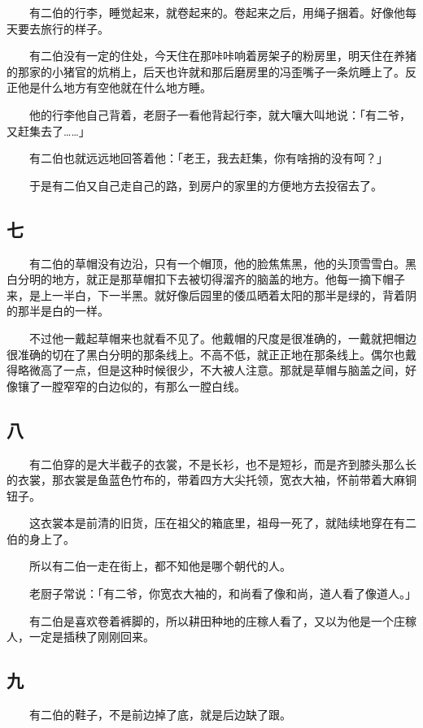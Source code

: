 \documentclass[UTF8]{ctexart}
\begin{document}
　　有二伯的行李，睡觉起来，就卷起来的。卷起来之后，用绳子捆着。好像他每天要去旅行的样子。

　　有二伯没有一定的住处，今天住在那咔咔响着房架子的粉房里，明天住在养猪的那家的小猪官的炕梢上，后天也许就和那后磨房里的冯歪嘴子一条炕睡上了。反正他是什么地方有空他就在什么地方睡。

　　他的行李他自己背着，老厨子一看他背起行李，就大嚷大叫地说：「有二爷，又赶集去了……」

　　有二伯也就远远地回答着他：「老王，我去赶集，你有啥捎的没有呵？」

　　于是有二伯又自己走自己的路，到房户的家里的方便地方去投宿去了。

\subsection{七}

　　有二伯的草帽没有边沿，只有一个帽顶，他的脸焦焦黑，他的头顶雪雪白。黑白分明的地方，就正是那草帽扣下去被切得溜齐的脑盖的地方。他每一摘下帽子来，是上一半白，下一半黑。就好像后园里的倭瓜晒着太阳的那半是绿的，背着阴的那半是白的一样。

　　不过他一戴起草帽来也就看不见了。他戴帽的尺度是很准确的，一戴就把帽边很准确的切在了黑白分明的那条线上。不高不低，就正正地在那条线上。偶尔也戴得略微高了一点，但是这种时候很少，不大被人注意。那就是草帽与脑盖之间，好像镶了一膛窄窄的白边似的，有那么一膛白线。

\subsection{八}

　　有二伯穿的是大半截子的衣裳，不是长衫，也不是短衫，而是齐到膝头那么长的衣裳，那衣裳是鱼蓝色竹布的，带着四方大尖托领，宽衣大袖，怀前带着大麻铜钮子。

　　这衣裳本是前清的旧货，压在祖父的箱底里，祖母一死了，就陆续地穿在有二伯的身上了。

　　所以有二伯一走在街上，都不知他是哪个朝代的人。

　　老厨子常说：「有二爷，你宽衣大袖的，和尚看了像和尚，道人看了像道人。」

　　有二伯是喜欢卷着裤脚的，所以耕田种地的庄稼人看了，又以为他是一个庄稼人，一定是插秧了刚刚回来。

\subsection{九}

　　有二伯的鞋子，不是前边掉了底，就是后边缺了跟。
\end{document}
